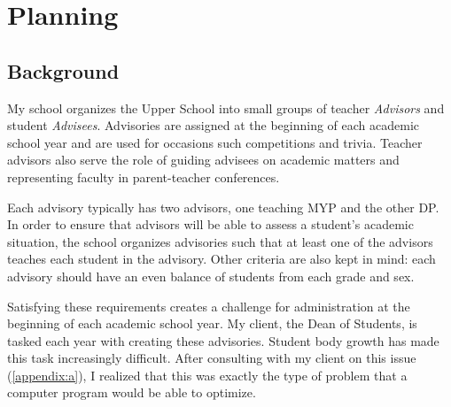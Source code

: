\documentclass{paper}
\begin{document}
\insertTitlePage
{}
\tableofcontents
\thispagestyle{frontorback}
\newpage
\setcounter{page}{1}
\justifying

\section{Planning}
\label{sec:planning}
\subsection{Background}
My school organizes the Upper School into small groups of teacher \emph{Advisors} and student \emph{Advisees}.
Advisories are assigned at the beginning of each academic school year and are used for occasions such competitions and trivia.
Teacher advisors also serve the role of guiding advisees on academic matters and representing faculty in parent-teacher conferences.

Each advisory typically has two advisors, one teaching MYP and the other DP.
In order to ensure that advisors will be able to assess a student's academic situation, the school organizes advisories such that at least one of the advisors teaches each student in the advisory.
Other criteria are also kept in mind: each advisory should have an even balance of students from each grade and sex.

Satisfying these requirements creates a challenge for administration at the beginning of each academic school year.
My client, the Dean of Students, is tasked each year with creating these advisories.
Student body growth has made this task increasingly difficult.
After consulting with my client on this issue (\cref{appendix:a}), I realized that this was exactly the type of problem that a computer program would be able to optimize.
\end{document}
